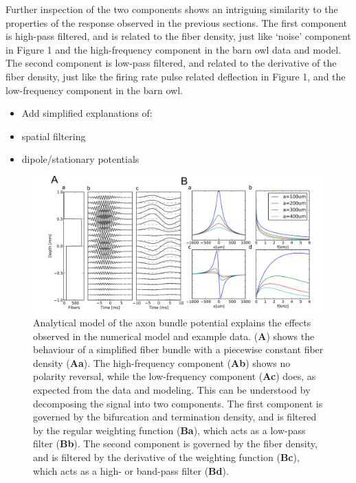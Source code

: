 \documentclass[]{article}
\begin{document}
Further inspection of the two components shows an intriguing similarity
to the properties of the response observed in the previous sections. The
first component is high-pass filtered, and is related to the fiber
density, just like `noise' component in Figure 1 and the high-frequency
component in the barn owl data and model. The second component is
low-pass filtered, and related to the derivative of the fiber density,
just like the firing rate pulse related deflection in Figure 1, and the
low-frequency component in the barn owl.

\begin{itemize}
\itemsep1pt\parskip0pt
\item
  Add simplified explanations of:
\item
  spatial filtering
\item
  dipole/stationary potentials
\end{itemize}

\begin{figure}[htbp]
\centering
\includegraphics{../figs/mockups/fig5.pdf}
\caption{Analytical model of the axon bundle potential explains the
effects observed in the numerical model and example data. (\textbf{A})
shows the behaviour of a simplified fiber bundle with a piecewise
constant fiber density (\textbf{Aa}). The high-frequency component
(\textbf{Ab}) shows no polarity reversal, while the low-frequency
component (\textbf{Ac}) does, as expected from the data and modeling.
This can be understood by decomposing the signal into two components.
The first component is governed by the bifurcation and termination
density, and is filtered by the regular weighting function
(\textbf{Ba}), which acts as a low-pass filter (\textbf{Bb}). The second
component is governed by the fiber density, and is filtered by the
derivative of the weighting function (\textbf{Bc}), which acts as a
high- or band-pass filter (\textbf{Bd}).}
\end{figure}
\end{document}
